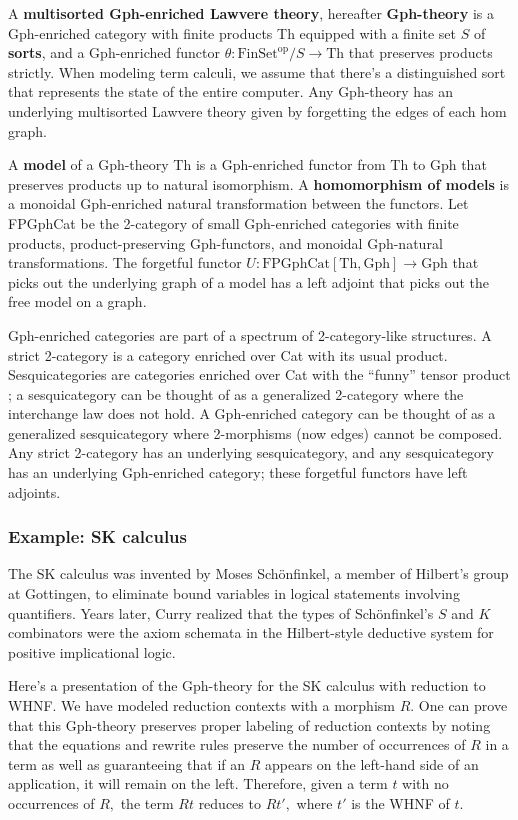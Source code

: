 \documentclass[submission,copyright,creativecommons]{eptcs}
\newcommand{\maps}{\colon}
\newcommand{\Th}{\mathrm{Th}}
\newcommand{\Gph}{\mathrm{Gph}}
\newcommand{\FinSet}{\mathrm{FinSet}}
\newcommand{\FPGphCat}{\mathrm{FPGphCat}}
\newcommand{\op}{\mathrm{op}}
\begin{document}
A {\bf multisorted Gph-enriched Lawvere theory}, hereafter {\bf Gph-theory} is a Gph-enriched category with finite products Th equipped with a finite set $S$ of {\bf sorts}, and a Gph-enriched functor $\theta\maps \FinSet^{\op}/S \to \Th$ that preserves products strictly.  When modeling term calculi, we assume that there's a distinguished sort that represents the state of the entire computer.  Any Gph-theory has an underlying multisorted Lawvere theory given by forgetting the edges of each hom graph.

A {\bf model} of a Gph-theory Th is a Gph-enriched functor from Th to Gph that preserves products up to natural isomorphism.  A {\bf homomorphism of models} is a monoidal Gph-enriched natural transformation between the functors.  Let FPGphCat be the 2-category of small Gph-enriched categories with finite products, product-preserving Gph-functors, and monoidal Gph-natural transformations.  The forgetful functor $U\maps \FPGphCat[\Th, \Gph] \to \Gph$ that picks out the underlying graph of a model has a left adjoint that picks out the free model on a graph.

Gph-enriched categories are part of a spectrum of 2-category-like structures.  A strict 2-category is a category enriched over Cat with its usual product.  Sesquicategories are categories enriched over Cat with the ``funny'' tensor product \cite{Lack2010}; a sesquicategory can be thought of as a generalized 2-category where the interchange law does not hold.  A Gph-enriched category can be thought of as a generalized sesquicategory where 2-morphisms (now edges) cannot be composed.  Any strict 2-category has an underlying sesquicategory, and any sesquicategory has an underlying Gph-enriched category; these forgetful functors have left adjoints.

\subsubsection{Example: SK calculus}
\label{skexample}
The SK calculus was invented by Moses Sch\"onfinkel, a member of Hilbert's group at Gottingen, to eliminate bound variables in logical statements involving quantifiers.  Years later, Curry realized that the types of Sch\"onfinkel's $S$ and $K$ combinators were the axiom schemata in the Hilbert-style deductive system for positive implicational logic.

Here's a presentation of the Gph-theory for the SK calculus with reduction to WHNF.  We have modeled reduction contexts with a morphism $R.$  One can prove that this Gph-theory preserves proper labeling of reduction contexts by noting that the equations and rewrite rules preserve the number of occurrences of $R$ in a term as well as guaranteeing that if an $R$ appears on the left-hand side of an application, it will remain on the left.  Therefore, given a term $t$ with no occurrences of $R,$ the term $Rt$ reduces to $Rt',$ where $t'$ is the WHNF of $t.$
\end{document}
